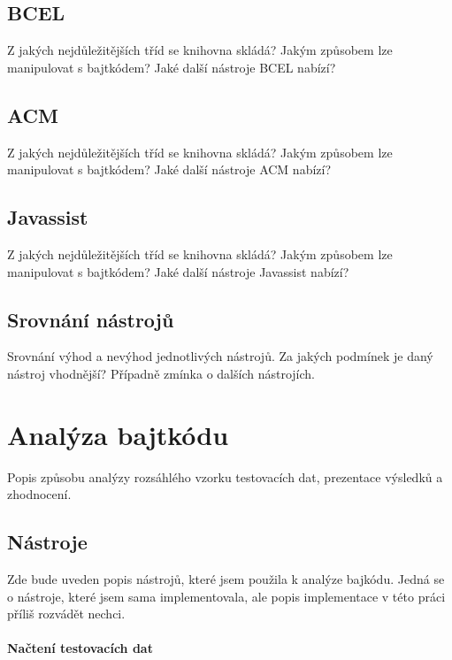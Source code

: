 \section{BCEL}

Z jakých nejdůležitějších tříd se knihovna skládá?
Jakým způsobem lze manipulovat s bajtkódem?
Jaké další nástroje BCEL nabízí?

\section{ACM}

Z jakých nejdůležitějších tříd se knihovna skládá?
Jakým způsobem lze manipulovat s bajtkódem?
Jaké další nástroje ACM nabízí?


\section{Javassist}

Z jakých nejdůležitějších tříd se knihovna skládá?
Jakým způsobem lze manipulovat s bajtkódem?
Jaké další nástroje Javassist nabízí?

\section{Srovnání nástrojů}

Srovnání výhod a nevýhod jednotlivých nástrojů. Za jakých podmínek je daný nástroj vhodnější?
Případně zmínka o dalších nástrojích.


\chapter{Analýza bajtkódu}

Popis způsobu analýzy rozsáhlého vzorku testovacích dat, prezentace výsledků a zhodnocení.

\section{Nástroje}

Zde bude uveden popis nástrojů, které jsem použila k analýze bajkódu. 
Jedná se o nástroje, které jsem sama implementovala, ale popis implementace v této práci příliš rozvádět nechci.

\subsubsection{Načtení testovacích dat}

